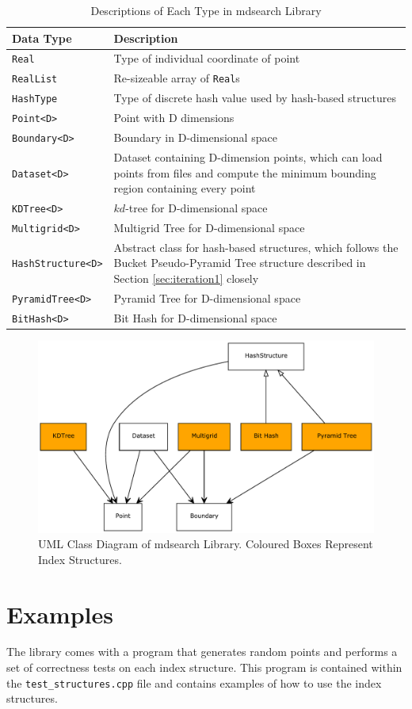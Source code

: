 \begin{table}[h]
	\centering
	\begin{tabular}{|p{4.25cm}|p{9.5cm}|}
		\hline
		\textbf{Data Type} & \textbf{Description} \\
		\hline
		\texttt{Real} & Type of individual coordinate of point \\
		\texttt{RealList} & Re-sizeable array of \texttt{Real}s \\
		\texttt{HashType} & Type of discrete hash value used by hash-based structures \\
		\texttt{Point<D>} & Point with D dimensions \\
		\texttt{Boundary<D>} & Boundary in D-dimensional space \\
		\texttt{Dataset<D>} & Dataset containing D-dimension points, which can load points from files and compute the minimum bounding region containing every point \\
		\texttt{KDTree<D>} & $kd$-tree for D-dimensional space \\
		\texttt{Multigrid<D>} & Multigrid Tree for D-dimensional space \\
		\texttt{HashStructure<D>} & Abstract class for hash-based structures, which follows the Bucket Pseudo-Pyramid Tree structure described in Section \ref{sec:iteration1} closely \\
		\texttt{PyramidTree<D>} & Pyramid Tree for D-dimensional space \\
		\texttt{BitHash<D>} & Bit Hash for D-dimensional space \\
		\hline
	\end{tabular}
	\caption{Descriptions of Each Type in mdsearch Library}
	\label{tab:library-classes}
\end{table}

\begin{figure}[h]
	\centering
	\includegraphics[scale=0.6]{figures/mdsearch_classes_uml.pdf}
	\caption{UML Class Diagram of mdsearch Library. Coloured Boxes Represent Index Structures.}
	\label{fig:library-class-diagram} 
\end{figure}

\section{Examples}

The library comes with a program that generates random points and performs a set of correctness tests on each index structure. This program is contained within the \texttt{test\_structures.cpp} file and contains examples of how to use the index structures.